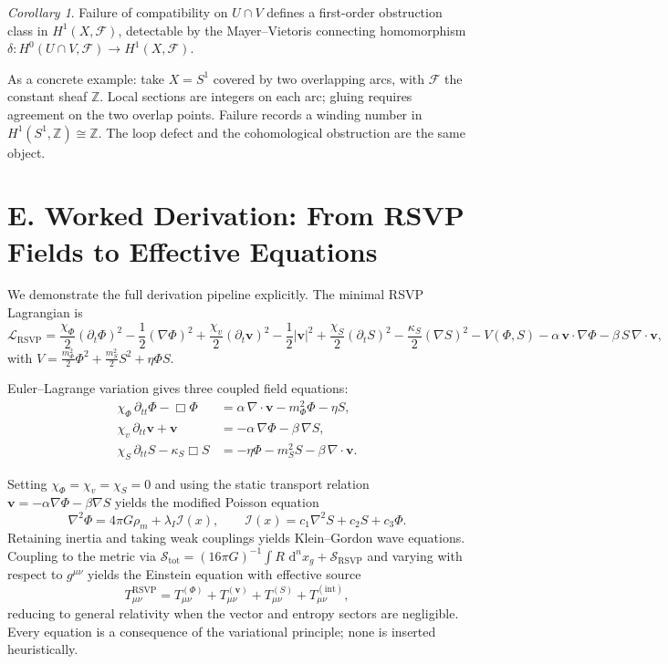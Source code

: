 \documentclass[12pt,a4paper,openany]{book}
\theoremstyle{plain}
\theoremstyle{definition}
\theoremstyle{remark}
\newtheorem*{corollary*}{Corollary}
\newcommand{\dvol}{\,\mathrm{d}^n x}
\begin{document}
\begin{corollary*}
Failure of compatibility on $U \cap V$ defines a first-order obstruction class in $H^1(X, \mathcal{F})$, detectable by the Mayer--Vietoris connecting homomorphism $\delta : H^0(U\cap V,\mathcal{F}) \to H^1(X,\mathcal{F})$.
\end{corollary*}

As a concrete example: take $X = S^1$ covered by two overlapping arcs, with $\mathcal{F}$ the constant sheaf $\mathbb{Z}$. Local sections are integers on each arc; gluing requires agreement on the two overlap points. Failure records a winding number in $H^1(S^1,\mathbb{Z}) \cong \mathbb{Z}$. The loop defect and the cohomological obstruction are the same object.

\section*{E. Worked Derivation: From RSVP Fields to Effective Equations}
\label{app:worked_derivation}

We demonstrate the full derivation pipeline explicitly. The minimal RSVP Lagrangian is
\[
\mathcal{L}_{\mathrm{RSVP}}
=
\frac{\chi_\Phi}{2}(\partial_t\Phi)^2 - \frac{1}{2}(\nabla\Phi)^2
+ \frac{\chi_v}{2}(\partial_t\mathbf{v})^2 - \frac{1}{2}|\mathbf{v}|^2
+ \frac{\chi_S}{2}(\partial_t S)^2 - \frac{\kappa_S}{2}(\nabla S)^2
- V(\Phi,S) - \alpha\,\mathbf{v}\cdot\nabla\Phi - \beta\,S\,\nabla\cdot\mathbf{v},
\]
with $V = \frac{m_\Phi^2}{2}\Phi^2 + \frac{m_S^2}{2}S^2 + \eta\Phi S$.

Euler--Lagrange variation gives three coupled field equations:
\begin{align}
\chi_\Phi\,\partial_{tt}\Phi - \Box\Phi &= \alpha\,\nabla\cdot\mathbf{v} - m_\Phi^2\Phi - \eta S, \label{eq:app_phi}\\
\chi_v\,\partial_{tt}\mathbf{v} + \mathbf{v} &= -\alpha\,\nabla\Phi - \beta\,\nabla S, \label{eq:app_v}\\
\chi_S\,\partial_{tt}S - \kappa_S\Box S &= -\eta\Phi - m_S^2 S - \beta\,\nabla\cdot\mathbf{v}. \label{eq:app_s}
\end{align}

Setting $\chi_\Phi = \chi_v = \chi_S = 0$ and using the static transport relation $\mathbf{v} = -\alpha\nabla\Phi - \beta\nabla S$ yields the modified Poisson equation
\[
\nabla^2\Phi = 4\pi G\rho_m + \lambda_I\mathcal{I}(x),
\qquad \mathcal{I}(x) = c_1\nabla^2 S + c_2 S + c_3\Phi.
\]
Retaining inertia and taking weak couplings yields Klein--Gordon wave equations. Coupling to the metric via $\mathcal{S}_{\mathrm{tot}} = (16\pi G)^{-1}\int R\,\dvol_g + \mathcal{S}_{\mathrm{RSVP}}$ and varying with respect to $g^{\mu\nu}$ yields the Einstein equation with effective source
\[
T_{\mu\nu}^{\mathrm{RSVP}} = T_{\mu\nu}^{(\Phi)} + T_{\mu\nu}^{(\mathbf{v})} + T_{\mu\nu}^{(S)} + T_{\mu\nu}^{(\mathrm{int})},
\]
reducing to general relativity when the vector and entropy sectors are negligible. Every equation is a consequence of the variational principle; none is inserted heuristically.
\end{document}
